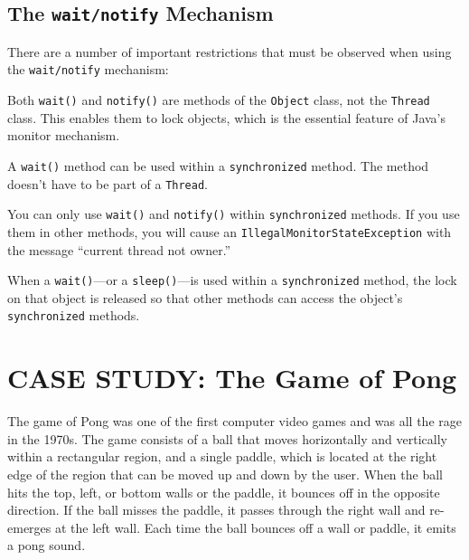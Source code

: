 \subsection*{The {\tt wait/notify} Mechanism}
\noindent There are a number of important restrictions that must be observed
when using the {\tt wait/notify} mechanism:

\begin{BL}
\item  Both {\tt wait()} and {\tt notify()} are methods of the
{\tt Object} class, not the {\tt Thread} class.  This enables
them to lock objects, which is the essential feature of
Java's monitor mechanism.

\item  A {\tt wait()} method can be used within a {\tt synchronized}
method.  The method doesn't have to be part of a {\tt Thread}.


\item  You can only use {\tt wait()} and {\tt notify()}  within
{\tt synchronized} methods.  If you use them in other methods,
you will cause an {\tt Illegal\-Moni\-torStateException} with
the message ``current thread not owner.''

\item  When a {\tt wait()}---or a {\tt sleep()}---is used within a
{\tt synchronized} method, the lock on that object is released
so that other methods can access the object's {\tt synchronized}
methods.
\end{BL}


\section{CASE STUDY: The Game of Pong}
\label{casestudy-the-gameof-pong}

The game of Pong was one of the first computer video games and was all
the rage in the 1970s. The game consists of a ball that moves
horizontally and vertically within a rectangular region, and a single
paddle, which is located at the right edge of the region that can
be moved up and down by the user. When the ball hits the top, left,
or bottom walls or the paddle, it bounces off in the opposite
direction. If the ball misses the paddle, it passes through the right
wall and re-emerges at the left wall. Each time the ball bounces off
a wall or paddle, it emits a pong sound.

